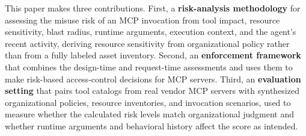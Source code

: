 This paper makes three contributions. First, a \textbf{risk-analysis methodology}
for assessing the misuse risk of an MCP invocation from tool impact, resource
sensitivity, blast radius, runtime arguments, execution context, and the agent's
recent activity, deriving resource sensitivity from organizational policy rather
than from a fully labeled asset inventory. Second, an \textbf{enforcement
framework} that combines the design-time and request-time assessments and uses
them to make risk-based access-control decisions for MCP servers. Third, an
\textbf{evaluation setting} that pairs tool catalogs from real vendor MCP servers
with synthesized organizational policies, resource inventories, and invocation
scenarios, used to measure whether the calculated risk levels match
organizational judgment and whether runtime arguments and behavioral history
affect the score as intended.

%
